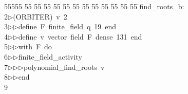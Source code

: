%
%
\begin{tabbing}
55555 \= 55 \= 55 \= 55 \= 55 \= 55 \= 55 \= 55 \= 55 \= 55 \= 55 \= 55 \= 55 \= \>find\_roots\_b:\\[0pt]
2\>$\triangleright$\>(ORBITER)\ v\ 2\ \\[0pt]
3\>$\triangleright$\>$\triangleright$\>define\ F\ finite\_field\ q\ 19\ end\ \\[0pt]
4\>$\triangleright$\>$\triangleright$\>define\ v\ vector\ field\ F\ dense\ 131\ end\ \\[0pt]
5\>$\triangleright$\>$\triangleright$\>with\ F\ do\ \\[0pt]
6\>$\triangleright$\>$\triangleright$\>finite\_field\_activity\ \\[0pt]
7\>$\triangleright$\>$\triangleright$\>$\triangleright$\>polynomial\_find\_roots\ v\ \\[0pt]
8\>$\triangleright$\>$\triangleright$\>end\\[0pt]
9\>\end{tabbing}
